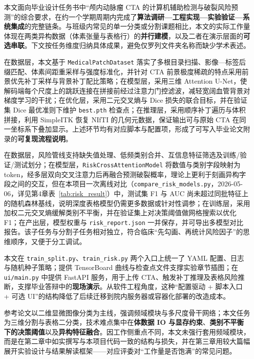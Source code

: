 
本文面向毕业设计任务书中“颅内动脉瘤 CTA 的计算机辅助检测与破裂风险预测”的综合要求，在约一个学期周期内完成了\textbf{算法调研—工程实现—实验验证—系统集成}的完整链条。与班级内常见的单一分类或分割课题相比，本文的实际工作量体现在两类异构数据（体素张量与表格行）的\textbf{并行建模}，以及二者在演示层面的\textbf{可选串联}。下文按任务维度归纳具体成果，避免仅罗列文件夹名称而缺少学术表述。

在数据层，本文基于 \texttt{MedicalPatchDataset} 落实了多根目录扫描、影像—标签后缀匹配、体素间距重采样与强度标准化，并针对 CTA 前景极度稀疏的特点采用前景优先补丁采样与背景补丁配比策略；在模型层，采用三维 Attention U-Net，使解码端每个尺度上的跳跃连接在拼接前经过注意力门控滤波，减轻宽阔血管背景对梯度学习的干扰；在优化层，采用二元交叉熵与 Dice 损失的联合目标，并在验证集 Dice 最优准则下维护 \texttt{best.pth} 检查点；在推理层，采用顺序补丁遍历与体积拼接，利用 SimpleITK 恢复 NIfTI 的几何元数据，保证输出可与原始 CTA 在同一坐标系下叠加显示。上述环节均有对应脚本与配置项，形成了可写入毕业论文附录的\textbf{可复现流程说明}。

在数据层，风险管线支持缺失值处理、低频类别合并、互信息特征筛选及训练/验证/测试划分；在模型层，\texttt{RiskCrossAttentionModel} 将数值与类别字段映射为 token，经多层双向交叉注意力后再融合预测破裂概率，理论上更利于刻画异构字段之间的交互，但在本项目一次离线对比（\texttt{compare\_risk\_models.py}，2026-05-06，详见第4章表~\ref{tab:risk_result}）中，测试集 F1 与 AUC 尚未超过同批特征上的随机森林基线，说明深度表格模型仍需更多数据或针对性调参；在训练层，采用加权二元交叉熵缓解类别不平衡，并在验证集上对决策阈值做网格搜索以优化 F1；在产出层，模型权重与 \texttt{risk\_report.json} 一并保存，并可导出多模型对比报告。该子任务与分割子任务相对独立，符合临床“先勾画、再统计风险因子”的思维顺序，又便于分工调试。

本文在 \texttt{train\_split.py}、\texttt{train\_risk.py} 两个入口上统一了 YAML 配置、日志与随机种子策略；提供 TensorBoard 曲线与检查点文件支撑实验章节插图；在 \texttt{ui/main.py} 中提供 FastAPI 服务，用于上传 CTA、触发补丁推理及表格风险推断，支撑毕业答辩中的\textbf{现场演示}。从软件工程角度，这种“配置驱动 + 脚本入口 + 可选 UI”的结构降低了后续迁移到院内服务器或容器化部署的改造成本。

参考论文以二维显微图像分类为主线，强调频域模块与多尺度骨干网络；本文任务为三维分割与表格二分类，技术难点集中在\textbf{体数据 IO 与显存约束}、\textbf{类别不平衡下的决策阈值}以及\textbf{异构特征融合}。因工作侧重点不同，本文未强行套用频域模块，而是在第二章中如实撰写与本项目代码一致的结构与损失，并在第三章用较大篇幅展开实验设计与结果解读框架——对应评委对“工作量是否饱满”的常见问题。


